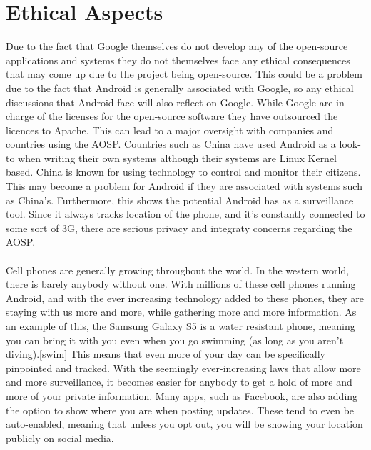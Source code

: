 \documentclass[conference]{IEEEtran}
\begin{document}
\section{Ethical Aspects}
\label{ethics}

Due to the fact that Google themselves do not develop any of the open-source applications and systems they do not themselves face any ethical consequences that may come up due to the project being open-source. This could be a problem due to the fact that Android is generally associated with Google, so any ethical discussions that Android face will also reflect on Google. While Google are in charge of the licenses for the open-source software they have outsourced the licences to Apache.\cite{android-licenses} This can lead to a major oversight with companies and countries using the AOSP. Countries such as China have used Android as a look-to when writing their own systems\cite{country-license} although their systems are Linux Kernel based. China is known for using technology to control and monitor their citizens. This may become a problem for Android if they are associated with systems such as China's. Furthermore, this shows the potential Android has as a surveillance tool. Since it always tracks location of the phone, and it's constantly connected to some sort of 3G, there are serious privacy and integraty concerns regarding the AOSP. 
\\\\Cell phones are generally growing throughout the world. In the western world, there is barely anybody without one. With millions of these cell phones running Android, and with the ever increasing technology added to these phones, they are staying with us more and more, while gathering more and more information. As an example of this, the Samsung Galaxy S5 is a water resistant phone, meaning you can bring it with you even when you go swimming (as long as you aren't diving).\ref{swim} This means that even more of your day can be specifically pinpointed and tracked. With the seemingly ever-increasing laws that allow more and more surveillance, it becomes easier for anybody to get a hold of more and more of your private information.  Many apps, such as Facebook, are also adding the option to show where you are when posting updates. These tend to even be auto-enabled, meaning that unless you opt out, you will be showing your location publicly on social media. 
\end{document}
